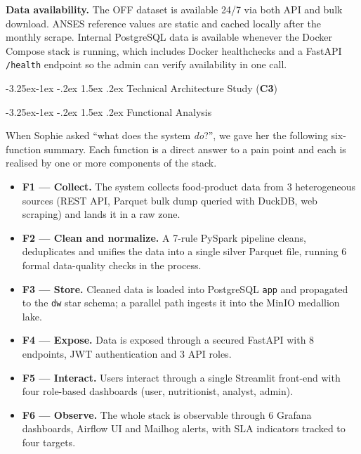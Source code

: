 \documentclass[a4paper,11pt,oneside,openany]{report}
\makeatletter
\renewcommand\subsection{\@startsection{subsection}{2}{\z@}%
  {-3.25ex\@plus -1ex \@minus -.2ex}%
  {1.5ex \@plus .2ex}%
  {\normalfont\large\bfseries\color{ntdarkgreen}}}
\renewcommand\subsubsection{\@startsection{subsubsection}{3}{\z@}%
  {-3.25ex\@plus -1ex \@minus -.2ex}%
  {1.5ex \@plus .2ex}%
  {\normalfont\normalsize\bfseries\color{ntblue}}}
\newcommand{\competence}[1]{\textbf{\textcolor{ntgreen}{#1}}}
\makeatother
\begin{document}
\textbf{Data availability.} The OFF dataset is available 24/7 via
both API and bulk download. ANSES reference values are static and
cached locally after the monthly scrape. Internal PostgreSQL data
is available whenever the Docker Compose stack is running, which
includes Docker healthchecks and a FastAPI \texttt{/health}
endpoint so the admin can verify availability in one call.

\subsection{Technical Architecture Study (\competence{C3})}

\subsubsection{Functional Analysis}

When Sophie asked ``what does the system \emph{do}?'', we gave her
the following six-function summary. Each function is a direct
answer to a pain point and each is realised by one or more
components of the stack.

\begin{itemize}[nosep]
  \item \textbf{F1 --- Collect.} The system collects food-product
        data from 3 heterogeneous sources (REST API, Parquet bulk
        dump queried with DuckDB, web scraping) and lands it in a
        raw zone.
  \item \textbf{F2 --- Clean and normalize.} A 7-rule PySpark
        pipeline cleans, deduplicates and unifies the data into a
        single silver Parquet file, running 6 formal data-quality
        checks in the process.
  \item \textbf{F3 --- Store.} Cleaned data is loaded into
        PostgreSQL \texttt{app} and propagated to the \texttt{dw}
        star schema; a parallel path ingests it into the MinIO
        medallion lake.
  \item \textbf{F4 --- Expose.} Data is exposed through a secured
        FastAPI with 8 endpoints, JWT authentication and 3 API
        roles.
  \item \textbf{F5 --- Interact.} Users interact through a
        single Streamlit front-end with four role-based dashboards
        (user, nutritionist, analyst, admin).
  \item \textbf{F6 --- Observe.} The whole stack is observable
        through 6 Grafana dashboards, Airflow UI and Mailhog
        alerts, with SLA indicators tracked to four targets.
\end{itemize}
\end{document}
